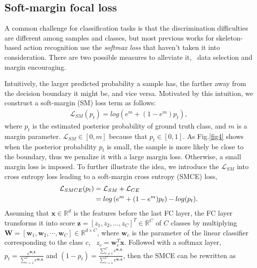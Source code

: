 \documentclass{article}
\begin{document}
\subsection{Soft-margin focal loss}
A common challenge for classification tasks is that the discrimination difficulties are different among samples and classes, but most previous works for skeleton-based action recognition use the \textit{softmax loss} that haven't taken it into consideration. There are two possible measures to alleviate it, \ie~data selection and margin encouraging.

Intuitively, the larger predicted probability a sample has, the farther away from the decision boundary it might be, and vice versa. Motivated by this intuition, we construct a soft-margin (SM) loss term as follows:
{\myfont
	\begin{align}
	\mathcal{L}_{SM}(p_t) = log\left( e^m+(1-e^m)p_t\right),
	\end{align}
}where $ p_t $ is the estimated posterior probability of ground truth class, and $ m $ is a margin parameter. {\myfont$ \mathcal{L}_{SM} \in [0,m]$} because that $ p_t\in[0,1] $. As Fig.\ref{fig4} shows when the posterior probability $ p_t $ is small, the sample is more likely be close to the boundary, thus we penalize it with a large margin loss. Otherwise, a small margin loss is imposed. To further illustrate the idea, we introduce the {\myfont$ \mathcal{L}_{SM} $} into cross entropy loss leading to a soft-margin cross entropy (SMCE) loss,
{\myfont
	\begin{align}
	\mathcal{L}_{SMCE}(p_t) & = \mathcal{L}_{SM} + \mathcal{L}_{CE} \\
	& = log\left( e^m+(1-e^m)p_t\right)-log(p_t). \notag
	\end{align}
}Assuming that {\myfont$ \bm{x}\in \mathbb{R}^d $} is the features before the last FC layer, the FC layer transforms it into score {\myfont$ \bm{z}= [z_1, z_2,\dots, z_C]^T \in \mathbb{R}^{C} $} of {\myfont$ C $} classes by multiplying {\myfont$ \bm{W} = [\bm{w}_1, \bm{w}_2, \cdots,\bm{w}_C] \in \mathbb{R}^{d \times C} $}, where {\myfont$ \bm{w}_c $} is the parameter of the linear classifier corresponding to the class $ c $, \ie~{\myfont$ z_c = \bm{w}_c^T \bm{x} $}. Followed with a softmax layer, {\myfont$ p_t = \frac{e^{\bm{w}_t\bm{x}}}{\sum_{c=1}^{C} e^{\bm{w}_c\bm{x}}}$} and {\myfont$ (1 - p_t) = \frac{\sum_{c\neq t}^{C}e^{\bm{w}_c\bm{x}}}{\sum_{c=1}^{C} e^{\bm{w}_c\bm{x}}}$}, then the SMCE can be rewritten as
\end{document}

